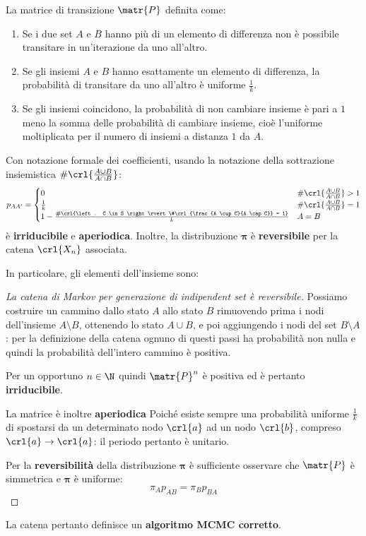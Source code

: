 \documentclass[\main/main.tex]{subfiles}
\begin{document}
\begin{theorem}
	La matrice di transizione \(\matr{P}\) definita come:
	\begin{enumerate}
		\item Se i due set \(A\) e \(B\) hanno più di un elemento di differenza non è possibile transitare in un'iterazione da uno all'altro.
		\item Se gli insiemi \(A\) e \(B\) hanno esattamente un elemento di differenza, la probabilità di transitare da uno all'altro è uniforme \(\frac{1}{k}\).
		\item Se gli insiemi coincidono, la probabilità di non cambiare insieme è pari a \(1\) meno la somma delle probabilità di cambiare insieme, cioè l'uniforme moltiplicata per il numero di insiemi a distanza \(1\) da \(A\).
	\end{enumerate}
	Con notazione formale dei coefficienti, usando la notazione della sottrazione insiemistica \(\#\crl{\frac{A \cup B}{A \cap B}}\):
	\[
		p_{AA'} = \begin{cases}
			0                                                                                       & \#\crl{\frac{A \cup B}{A \cap B}} > 1 \\
			\frac{1}{k}                                                                             & \#\crl{\frac{A \cup B}{A \cap B}} = 1 \\
			1 - \frac{\#\crl{\left. C \in S \right\rvert \#\crl{\frac{A \cup C}{A \cap C}} = 1}}{k} & A = B
		\end{cases}
	\]
	è \textbf{irriducibile} e \textbf{aperiodica}. Inoltre, la distribuzione \(\bm{\pi} \) è \textbf{reversibile} per la catena \(\crl{X_n}\) associata.

	In particolare, gli elementi dell'insieme sono:
\end{theorem}

\begin{proof}[La catena di Markov per generazione di indipendent set è reversibile]
	Possiamo costruire un cammino dallo stato \(A\) allo stato \(B\) rimuovendo prima i nodi dell'insieme \(A\setminus B\), ottenendo lo stato \(A\cup B\), e poi aggiungendo i nodi del set \(B \setminus A\): per la definizione della catena ognuno di questi passi ha probabilità non nulla e quindi la probabilità dell'intero cammino è positiva.

	Per un opportuno \(n \in \N \) quindi \(\matr{P}^n\) è positiva ed è pertanto \textbf{irriducibile}.

	La matrice è inoltre \textbf{aperiodica} Poiché esiste sempre una probabilità uniforme \(\frac{1}{k}\) di spostarsi da un determinato nodo \(\crl{a}\) ad un nodo \(\crl{b}\), compreso \(\crl{a}\rightarrow \crl{a}\): il periodo pertanto è unitario.

	Per la \textbf{reversibilità} della distribuzione \(\bm{\pi} \) è sufficiente osservare che \(\matr{P}\) è simmetrica e \(\bm{\pi} \) è uniforme:
	\[
		\pi_A p_{AB} = \pi_B p_{BA}
	\]
\end{proof}

La catena pertanto definisce un \textbf{algoritmo MCMC corretto}.
\end{document}
